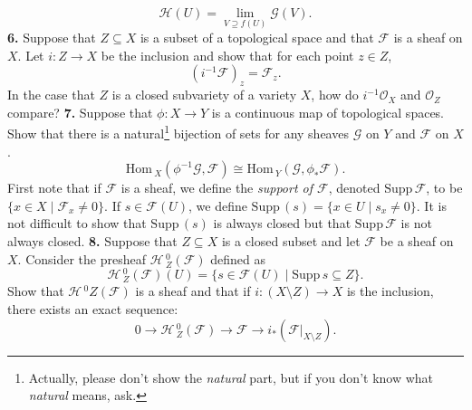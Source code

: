 \documentclass[11pt]{amsart}
\theoremstyle{theorem}
\renewcommand{\O}{\mathcal O}
\renewcommand{\to}[1][]{\xrightarrow{\ #1\ }}
\newcommand{\cF}{\mathcal{F}}
\newcommand{\cG}{\mathcal{G}}
\newcommand{\cH}{\mathcal{H}}
\newcommand{\Hom}{\mathrm{Hom}\,}
\newcommand{\Supp}{\mathrm{Supp}\,}
\newcommand{\sH}{\mathscr{H}\,}
\begin{document}
\[
\cH(U) = \lim_{V \supseteq f(U)} \cG(V).
\]
\vskip 12pt
\noindent
{\bf 6.}  Suppose that $Z \subseteq X$ is a subset of a topological space and that $\cF$ is a sheaf on $X$.  Let $i : Z \to X$ be the inclusion and show that for each point $z \in Z$,
\[
(i^{-1}\cF)_z = \cF_z.
\]
In the case that $Z$ is a closed subvariety of a variety $X$, how do $i^{-1} \O_X$ and $\O_Z$ compare?
\newpage
\noindent
{\bf 7.}  Suppose that $\phi : X \to Y$ is a continuous map of topological spaces.  Show that there is a natural\footnote{Actually, please don't show the \emph{natural} part, but if you don't know what \emph{natural} means, ask.} bijection of sets for any sheaves $\cG$ on $Y$ and $\cF$ on $X$.
\[
\Hom_X(\phi^{-1} \cG, \cF) \cong \Hom_Y(\cG, \phi_* \cF).
\]
\vskip 200pt
First note that if $\cF$ is a sheaf, we define the \emph{support of $\cF$}, denoted $\Supp \cF$, to be $\{x \in X \;|\; \cF_x \neq 0\}$.  If $s \in \cF(U)$, we define $\Supp(s) = \{x \in U\;|\; s_x \neq 0\}$.  It is not difficult to show that $\Supp(s)$ is always closed but that $\Supp \cF$ is not always closed.
\vskip 12pt
\noindent
{\bf 8.}  Suppose that $Z \subseteq X$ is a closed subset and let $\cF$ be a sheaf on $X$.  Consider the presheaf $\sH^0_Z(\cF)$ defined as
\[
\sH^0_Z(\cF)(U) = \{s \in \cF(U)\;|\; \Supp s \subseteq Z \}.
\]
Show that $\sH^0Z(\cF)$ is a sheaf and that if $i : (X \setminus Z) \to X$ is the inclusion, there exists an exact sequence:
\[
0 \to \sH^0_Z(\cF) \to \cF \to i_* (\cF|_{X \setminus Z}).
\]
\end{document}
